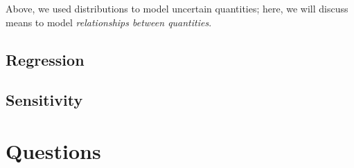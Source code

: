 \documentclass[../primer.tex]{subfiles}
\begin{document}
Above, we used distributions to model uncertain quantities; here, we will
discuss means to model \emph{relationships between quantities}.

\subsection{Regression}

\subsection{Sensitivity}


\section{Questions}
\end{document}

